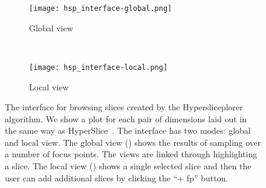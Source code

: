 

\begin{figure}
  \centering
  \begin{subfigure}[b]{0.45\linewidth}
    \texttt{[image: hsp\_interface-global.png]}
    \caption{Global view}
    \label{fig:interface:global} 
  \end{subfigure} 
  ~
  \begin{subfigure}[b]{0.45\linewidth}
    \texttt{[image: hsp\_interface-local.png]}
    \caption{Local view}
    \label{fig:interface:local} 
  \end{subfigure}
  \caption{%
    The interface for browsing slices created by the Hypersliceplorer algorithm.
    We show a plot for each pair of dimensions laid out in the same way as
    HyperSlice~\cite{Wijk:1993}.
    The interface has two modes: global and local view.
    The global view () 
    shows the results of sampling over a number of focus points. The views
    are linked through highlighting a slice. The local view 
    () shows a single selected slice and then
    the user can add additional slices by clicking the ``+ fp'' button.
  }
  \label{fig:interface}
\end{figure}









